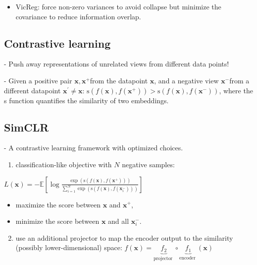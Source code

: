 \begin{itemize}
  \item VicReg: force non-zero variances to avoid collapse but minimize the covariance to reduce information overlap.
\end{itemize}



\subsection*{Contrastive learning}
- Push away representations of unrelated views from different data points!


- Given a positive pair $\mathbf{x}, \mathbf{x}^{+}$from the datapoint $\mathbf{x}$, and a negative view $\mathbf{x}^{-}$from a different datapoint $\mathbf{x}^{\prime} \neq \mathbf{x}$:
$\mathrm{s}\left(f(\mathbf{x}), f\left(\mathbf{x}^{+}\right)\right)>\mathrm{s}\left(f(\mathbf{x}), f\left(\mathbf{x}^{-}\right)\right)$,
where the s function quantifies the similarity of two embeddings.

\subsection*{SimCLR}
- A contrastive learning framework with optimized choices.

\begin{enumerate}
  \item classification-like objective with $N$ negative samples:
\end{enumerate}

$
L(\mathbf{x})=-\mathbb{E}\left[\log \frac{\exp \left(\mathrm{s}\left(f(\mathbf{x}), f\left(\mathbf{x}^{+}\right)\right)\right)}{\sum_{i=1}^{N} \exp \left(\mathrm{s}\left(f(\mathbf{x}), f\left(\mathbf{x}_{i}^{-}\right)\right)\right)}\right]
$

\begin{itemize}
  \item maximize the score between $\mathbf{x}$ and $\mathbf{x}^{+}$,
  \item minimize the score between $\mathbf{x}$ and all $\mathbf{x}_{i}^{-}$.
\end{itemize}

\begin{enumerate}
  \setcounter{enumi}{1}
  \item use an additional projector to map the encoder output to the similarity (possibly lower-dimensional) space:
  $
  f(\mathbf{x})=\underbrace{f_{2}}_{\text {projector }} \circ \underbrace{f_{1}}_{\text {encoder }}(\mathbf{x})
  $
\end{enumerate}


